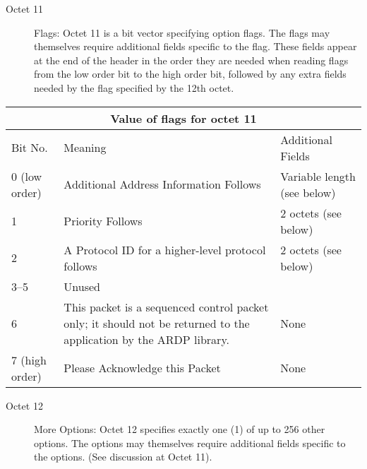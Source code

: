 \begin{description}
\item[Octet 11] Flags: Octet 11 is a bit vector specifying option flags.
The flags may themselves require additional
fields specific to the flag.  These fields appear at the end of the
header in the order they are needed when reading flags from the low
order bit to the high order bit, followed by any extra fields needed
by the flag specified by the 12th octet.  

\end{description}

\begin{center}
\begin{tabular}{|l|p{3.5in}|p{2.0in}|}
\multicolumn{3}{c}{Value of flags for octet 11} \\ \hline
Bit No. & Meaning & Additional Fields \\ \hline
0 (low order) & Additional Address Information Follows & 
	Variable length (see below)\\ \hline 
1       & Priority Follows & 2 octets (see below)\\ \hline
2 & A Protocol ID for a higher-level protocol follows & 
	2 octets (see below) \\ \hline
3--5    & Unused & \\ \hline
6       & This packet is a sequenced control packet only; it should
not be returned to the application by the ARDP library. & None \\ \hline
7 (high order) & Please Acknowledge this Packet & None \\ \hline
\end{tabular}
\end{center}


\begin{description}
\item[Octet 12] More Options:  Octet 12 specifies exactly one (1)
of up to 256 other options.  The options may themselves require additional
fields specific to the options.  (See discussion at Octet 11).  
\end{description}

